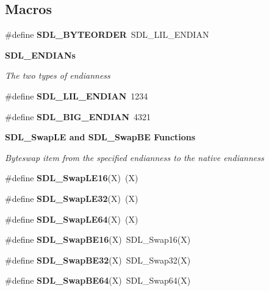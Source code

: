 \subsection*{Macros}
\begin{DoxyCompactItemize}
\item 
\#define {\bfseries S\+D\+L\+\_\+\+B\+Y\+T\+E\+O\+R\+D\+E\+R}~S\+D\+L\+\_\+\+L\+I\+L\+\_\+\+E\+N\+D\+I\+A\+N\label{_s_d_l__endian_8h_a0582882a281bd6c7580e454be3595703}

\end{DoxyCompactItemize}
\begin{Indent}{\bf S\+D\+L\+\_\+\+E\+N\+D\+I\+A\+Ns}\par
{\em The two types of endianness }\begin{DoxyCompactItemize}
\item 
\#define {\bfseries S\+D\+L\+\_\+\+L\+I\+L\+\_\+\+E\+N\+D\+I\+A\+N}~1234\label{_s_d_l__endian_8h_ad2b20e63545e73207b007b03bf08c2df}

\item 
\#define {\bfseries S\+D\+L\+\_\+\+B\+I\+G\+\_\+\+E\+N\+D\+I\+A\+N}~4321\label{_s_d_l__endian_8h_af22db189169b9aa7e356bf26b2a553f6}

\end{DoxyCompactItemize}
\end{Indent}
\begin{Indent}{\bf S\+D\+L\+\_\+\+Swap\+L\+E and S\+D\+L\+\_\+\+Swap\+B\+E Functions}\par
{\em Byteswap item from the specified endianness to the native endianness }\begin{DoxyCompactItemize}
\item 
\#define {\bfseries S\+D\+L\+\_\+\+Swap\+L\+E16}(X)~(X)\label{_s_d_l__endian_8h_ae650119b14f608de5d79e0d73a444c35}

\item 
\#define {\bfseries S\+D\+L\+\_\+\+Swap\+L\+E32}(X)~(X)\label{_s_d_l__endian_8h_a14265c62e134bff318afba31ec1b0911}

\item 
\#define {\bfseries S\+D\+L\+\_\+\+Swap\+L\+E64}(X)~(X)\label{_s_d_l__endian_8h_ae1c6fb787318750e4e974345bd46ca4b}

\item 
\#define {\bfseries S\+D\+L\+\_\+\+Swap\+B\+E16}(X)~S\+D\+L\+\_\+\+Swap16(X)\label{_s_d_l__endian_8h_aba916646d6a5abd082d5a21b406d3823}

\item 
\#define {\bfseries S\+D\+L\+\_\+\+Swap\+B\+E32}(X)~S\+D\+L\+\_\+\+Swap32(X)\label{_s_d_l__endian_8h_a2a2c8f38728448268d6d881f4a699d54}

\item 
\#define {\bfseries S\+D\+L\+\_\+\+Swap\+B\+E64}(X)~S\+D\+L\+\_\+\+Swap64(X)\label{_s_d_l__endian_8h_acc75cbc3e0bbf00dfd438e2186b91b03}

\end{DoxyCompactItemize}
\end{Indent}
